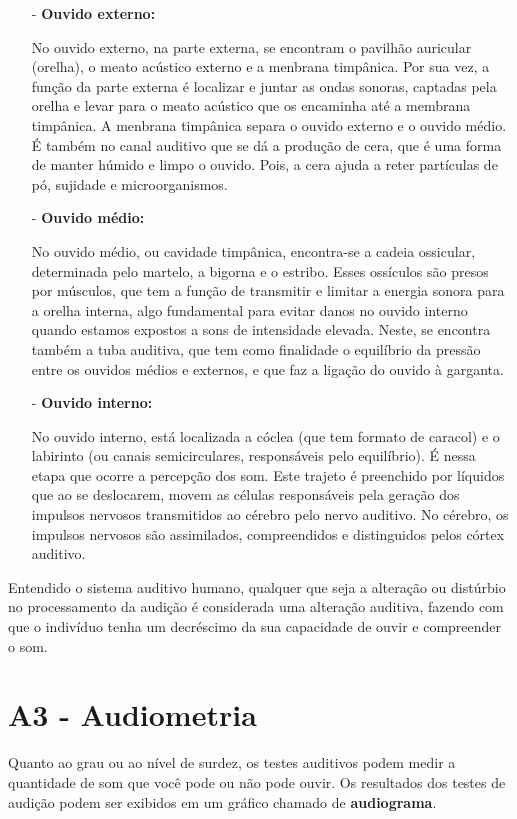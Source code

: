 \documentclass[brasil]{abnt}
\begin{document}
				\begin{itemize}		
					\item [-]\textbf{Ouvido externo:}
					
					{ No ouvido externo, na parte externa, se encontram o pavilhão auricular (orelha), o meato acústico externo e a menbrana timpânica. Por sua vez, a função da parte externa é localizar e 
					juntar as ondas sonoras, captadas pela orelha e levar para o meato acústico que os encaminha até a membrana timpânica. A menbrana timpânica separa o ouvido externo e o ouvido médio.
					É também no canal auditivo que se dá a produção de cera, que é uma forma de manter húmido e limpo o ouvido. Pois, a cera ajuda a reter partículas de pó, sujidade e microorganismos.} 
			
					\item[-]\textbf{Ouvido médio:}
					
					{ No ouvido médio, ou cavidade timpânica, encontra-se a cadeia ossicular, determinada pelo martelo, a bigorna e o estribo. Esses ossículos são presos por músculos, que tem a função de 
					transmitir e limitar a energia sonora para a orelha interna, algo fundamental para evitar danos no ouvido interno quando estamos expostos a sons de intensidade elevada. Neste, se 
					encontra também a tuba auditiva, que tem como finalidade o equilíbrio da pressão entre os ouvidos médios e externos, e que faz a ligação do ouvido à garganta.}
					
					\item[-]\textbf{Ouvido interno:}
					
					{ No ouvido interno, está localizada a cóclea (que tem formato de caracol) e o labirinto (ou canais semicirculares, responsáveis pelo equilíbrio). É nessa etapa que ocorre a percepção dos som.
					Este trajeto é preenchido por líquidos que ao se deslocarem, movem as células responsáveis pela geração dos impulsos nervosos transmitidos ao cérebro pelo nervo auditivo. No cérebro, os impulsos 
					nervosos são assimilados, compreendidos e distinguidos pelos córtex auditivo.}				
				\end{itemize}
				
			Entendido o sistema auditivo humano, qualquer que seja a alteração ou distúrbio no processamento da audição é considerada uma alteração auditiva, fazendo com que o indivíduo tenha um decréscimo da 
			sua capacidade de ouvir e compreender o som.

\chapter*{A3 - Audiometria}
	Quanto ao grau ou ao nível de surdez, os testes auditivos podem medir a quantidade de som que você pode ou não pode ouvir. 
	Os resultados dos testes de audição podem ser exibidos em um gráfico chamado de \textbf{audiograma}.
\end{document}
